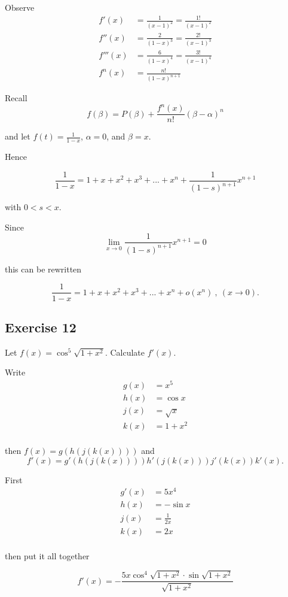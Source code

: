 \documentclass{tufte-book}
\theoremstyle{mytheoremstyle}
\theoremstyle{mylemstyle}
\theoremstyle{mydefstyle}
\begin{document}
Observe
\begin{align*}
f'(x) &= \frac{1}{(x-1)^2} = \frac{1!}{(x-1)^2} \\
f''(x) &= \frac{2}{(1-x)^3} = \frac{2!}{(x-1)^3}\\
f'''(x) &= \frac{6}{(1-x)^4}= \frac{3!}{(x-1)^4}\\
f^n(x) &= \frac{n!}{(1-x)^{n+1}}
\end{align*}

Recall
\[ f(\beta) = P(\beta) + \frac{f^{n}(x)}{n!}(\beta - \alpha)^n \]

and let $f(t) = \frac{1}{1-x}$, $\alpha=0$, and $\beta = x$.

Hence

\[ \frac{1}{1-x} = 1 + x + x^2 + x^3 + ... + x^n + \frac{1}{(1-s)^{n+1}}x^{n+1} \]

with $0 < s < x$.

Since
\[ \lim_{x \to 0} \frac{1}{(1-s)^{n+1}}x^{n+1} = 0 \]

this can be rewritten 

\[ \frac{1}{1-x} = 1 + x + x^2 + x^3 + ... + x^n + o(x^n) \ , \ (x \to 0). \]

\subsection{Exercise 12}

Let $f(x) = \cos^5 \sqrt{1 + x^2}$.  Calculate $f'(x)$.

Write
\begin{align*}
g(x) &= x^5 \\
h(x) &= \cos x \\
j(x) &= \sqrt{x} \\
k(x) &= 1+x^2\\
\end{align*}

then $f(x) = g(h(j(k(x))))$ and
\[ f'(x) = g'(h(j(k(x))))h'(j(k(x)))j'(k(x))k'(x). \]

First
\begin{align*}
g'(x) &= 5x^4 \\
h(x) &= -\sin x \\
j(x) &= \frac{1}{2x} \\
k(x) &= 2x\\
\end{align*}

then put it all together

\[ f'(x) = -\frac{5x \cos^4 \sqrt{1 + x^2} \cdot \sin \sqrt{1 + x^2}}{\sqrt{1+x^2}} \]
\end{document}
